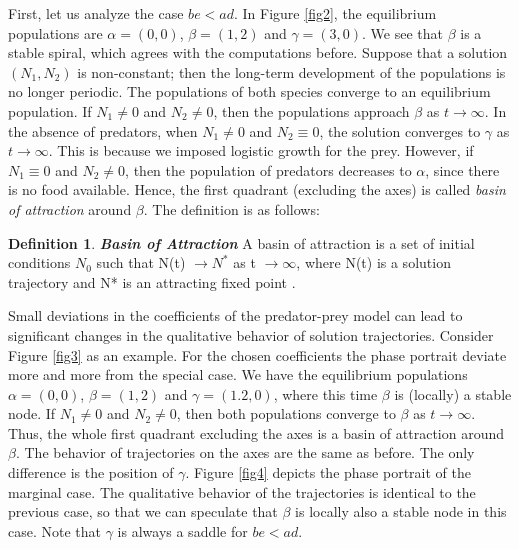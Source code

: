 \documentclass[11pt,a4paper]{scrartcl}
\theoremstyle{definition}
\newtheorem*{definition}{Definition}
\begin{document}
First, let us analyze the case $be<ad$. In Figure \ref{fig2}, the equilibrium populations are $\alpha=(0,0)$, $\beta=(1,2)$ and $\gamma=(3,0)$. We see that $\beta$ is a stable spiral, which agrees with the computations before. Suppose that a solution $(N_1,N_2)$ is non-constant; then the long-term development of the populations is no longer periodic. The populations of both species converge to an equilibrium population. If $N_1 \neq 0$ and $N_2 \neq 0$, then the populations approach $\beta$ as $t \rightarrow \infty$. In the absence of predators, when $N_1 \neq 0$ and $N_2 \equiv 0$, the solution converges to $\gamma$ as $t \rightarrow \infty$. This is because we imposed logistic growth for the prey. However, if $N_1 \equiv 0$ and $N_2 \neq 0$, then the population of predators decreases to $\alpha$, since there is no food available. Hence, the first quadrant (excluding the axes) is called \textit{basin of attraction} around $\beta$. The definition is as follows:

\begin{definition}{\textbf{\textit{Basin of Attraction}}}
\newline
A basin of attraction is a set of initial conditions $N_0$ such that N(t) $\rightarrow N^*$ as t $\rightarrow \infty$, where N(t) is a solution trajectory and N* is an attracting fixed point \cite{main}.
\end{definition}

Small deviations in the coefficients of the predator-prey model can lead to significant changes in the qualitative behavior of solution trajectories. Consider Figure \ref{fig3} as an example. For the chosen coefficients the phase portrait deviate more and more from the special case. We have the equilibrium populations $\alpha=(0,0)$, $\beta=(1,2)$ and $\gamma=(1.2,0)$, where this time $\beta$ is (locally) a stable node. If $N_1 \neq 0$ and $N_2 \neq 0$, then both populations converge to $\beta$ as $t \rightarrow \infty$. Thus, the whole first quadrant excluding the axes is a basin of attraction around $\beta$. The behavior of trajectories on the axes are the same as before. The only difference is the position of $\gamma$. Figure \ref{fig4} depicts the phase portrait of the marginal case. The qualitative behavior of the trajectories is identical to the previous case, so that we can speculate that $\beta$ is locally also a stable node in this case.  Note that $\gamma$ is always a saddle for $be<ad$.\newline
\end{document}
